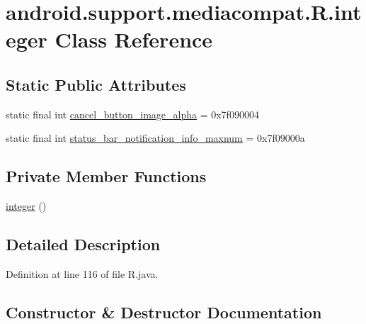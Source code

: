 \hypertarget{classandroid_1_1support_1_1mediacompat_1_1_r_1_1integer}{}\section{android.\+support.\+mediacompat.\+R.\+integer Class Reference}
\label{classandroid_1_1support_1_1mediacompat_1_1_r_1_1integer}
\subsection*{Static Public Attributes}
\begin{DoxyCompactItemize}
\item 
static final int \mbox{\hyperlink{classandroid_1_1support_1_1mediacompat_1_1_r_1_1integer_a929b14d75f7d8e007bb733c78f2befd9}{cancel\+\_\+button\+\_\+image\+\_\+alpha}} = 0x7f090004
\item 
static final int \mbox{\hyperlink{classandroid_1_1support_1_1mediacompat_1_1_r_1_1integer_a8eff02253ecf97f438548fe224122338}{status\+\_\+bar\+\_\+notification\+\_\+info\+\_\+maxnum}} = 0x7f09000a
\end{DoxyCompactItemize}
\subsection*{Private Member Functions}
\begin{DoxyCompactItemize}
\item 
\mbox{\hyperlink{classandroid_1_1support_1_1mediacompat_1_1_r_1_1integer_a66a2d410d0e683c05a646edf3d17800b}{integer}} ()
\end{DoxyCompactItemize}


\subsection{Detailed Description}


Definition at line 116 of file R.\+java.



\subsection{Constructor \& Destructor Documentation}
\mbox{\label{classandroid_1_1support_1_1mediacompat_1_1_r_1_1integer_a66a2d410d0e683c05a646edf3d17800b}} 
